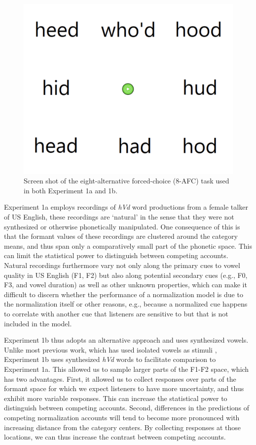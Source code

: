 \documentclass[preprint]{JASA}
\begin{document}
\begin{figure}

{\centering \includegraphics[width=0.4\linewidth]{figures/response-grid} 

}

\caption{Screen shot of the eight-alternative forced-choice (8-AFC) task used in both Experiment 1a and 1b.}\label{fig:exp-procedure}
\end{figure}

Experiment 1a employs recordings of \emph{hVd} word productions from a female talker of US English, these recordings are `natural' in the sense that they were not synthesized or otherwise phonetically manipulated. One consequence of this is that the formant values of these recordings are clustered around the category means, and thus span only a comparatively small part of the phonetic space. This can limit the statistical power to distinguish between competing accounts. Natural recordings furthermore vary not only along the primary cues to vowel quality in US English (F1, F2) but also along potential secondary cues (e.g., F0, F3, and vowel duration) as well as other unknown properties, which can make it difficult to discern whether the performance of a normalization model is due to the normalization itself or other reasons, e.g., because a normalized cue happens to correlate with another cue that listeners are sensitive to but that is not included in the model.

Experiment 1b thus adopts an alternative approach and uses synthesized vowels. Unlike most previous work, which has used isolated vowels as stimuli \citep{barreda-nearey2012, barreda2021, nearey1989, richter2017}, Experiment 1b uses synthesized \emph{hVd} words to facilitate comparison to Experiment 1a. This allowed us to sample larger parts of the F1-F2 space, which has two advantages. First, it allowed us to collect responses over parts of the formant space for which we expect listeners to have more uncertainty, and thus exhibit more variable responses. This can increase the statistical power to distinguish between competing accounts. Second, differences in the predictions of competing normalization accounts will tend to become more pronounced with increasing distance from the category centers. By collecting responses at those locations, we can thus increase the contrast between competing accounts.
\end{document}
